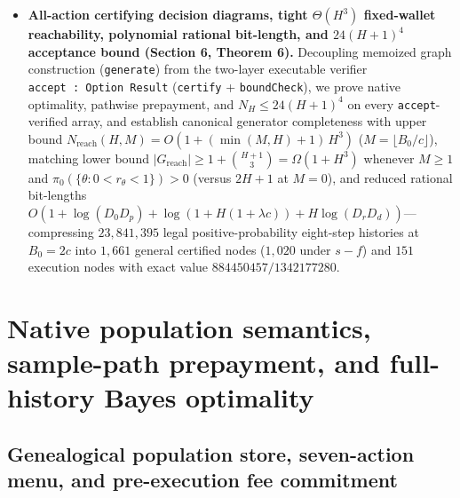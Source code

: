 \documentclass[11pt,letterpaper]{article}
\begin{document}
\begin{itemize}
{  (Section 5.2, Theorem 5).} We prove that the five-coordinate
  operational summary \(\sigma = (t, q, s, f, k)\) preserves feasible
  action menus and single-step joint distributions for \emph{every}
  legal action across arbitrary finite priors (further collapsing
  \((s,f)\) to net-success log-odds \(\delta = s - f\) under
  complementary two-point priors \(r_1 = 1 - r_0\)), while reachable
  witnesses prove physical-Markov insufficiency (\(5/8 \neq 1/2\)),
  lawful genealogy-erasing history mergers across all legal actions, and
  immediate separation if slot-2 dispatch is added (\(0\)
  vs.~\(r_\theta\)).
\item
  \textbf{All-action certifying decision diagrams, tight \(\Theta(H^3)\)
  fixed-wallet reachability, polynomial rational bit-length, and
  \(24(H+1)^4\) acceptance bound (Section 6, Theorem 6).} Decoupling
  memoized graph construction (\texttt{generate}) from the two-layer
  executable verifier \texttt{accept\ :\ Option\ Result}
  (\texttt{certify} + \texttt{boundCheck}), we prove native optimality,
  pathwise prepayment, and \(N_H \le 24(H+1)^4\) on every
  \texttt{accept}-verified array, and establish canonical generator
  completeness with upper bound
  \(N_{\mathrm{reach}}(H, M) = O(1 + (\min(M, H) + 1)\,H^3)\)
  (\(M = \lfloor B_0/c\rfloor\)), matching lower bound
  \(|G_{\mathrm{reach}}| \ge 1 + \binom{H+1}{3} = \Omega(1 + H^3)\)
  whenever \(M \ge 1\) and \(\pi_0(\{\theta : 0 < r_\theta < 1\}) > 0\)
  (versus \(2H + 1\) at \(M = 0\)), and reduced rational bit-lengths
  \(O(1 + \log(D_0 D_p) + \log(1 + H(1 + \lambda c)) + H\log(D_r D_d))\)---compressing
  \(23,841,395\) legal positive-probability eight-step histories at
  \(B_0 = 2c\) into \(1,661\) general certified nodes (\(1,020\) under
  \(s - f\)) and \(151\) execution nodes with exact value
  \(884450457 / 1342177280\).
\end{itemize}

\section{Native population semantics, sample-path prepayment, and
full-history Bayes
optimality}\label{native-population-semantics-sample-path-prepayment-and-full-history-bayes-optimality}

\subsection{Genealogical population store, seven-action menu, and
pre-execution fee
commitment}\label{genealogical-population-store-seven-action-menu-and-pre-execution-fee-commitment}
\end{document}
